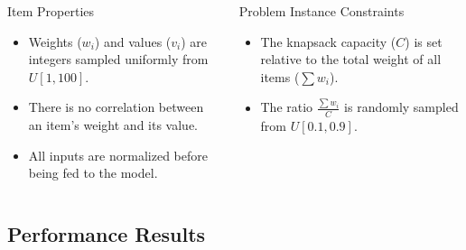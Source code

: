 \begin{frame}
    \begin{columns}[T]
        \begin{column}{0.5\textwidth}
            \begin{alertblock}{Item Properties}
                \begin{itemize}
                    \item Weights ($w_i$) and values ($v_i$) are integers sampled uniformly from $U[1, 100]$.
                    \item There is no correlation between an item's weight and its value.
                    \item All inputs are normalized before being fed to the model.
                \end{itemize}
            \end{alertblock}
        \end{column}
        \begin{column}{0.5\textwidth}
            \begin{alertblock}{Problem Instance Constraints}
                \begin{itemize}
                    \item The knapsack capacity ($C$) is set relative to the total weight of all items ($\sum w_i$).
                    \item The ratio $\frac{\sum w_i}{C}$ is randomly sampled from $U[0.1, 0.9]$.
                \end{itemize}
            \end{alertblock}
        \end{column}
    \end{columns}
    
\end{frame}

\subsection{Performance Results}

